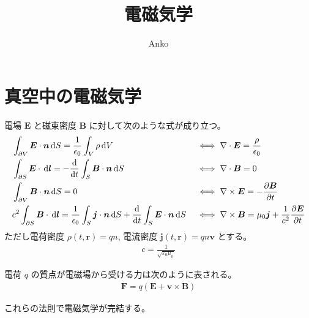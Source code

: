 \documentclass[uplatex,dvipdfmx,a4paper,11pt]{jlreq}
\title{電磁気学}
\author{Anko}
\newcommand{\EE}{\bm{E}}
\newcommand{\BB}{\bm{B}}
\newcommand{\rr}{\bm{r}}
\newcommand{\vnabla}{\mathbf{\nabla}}
\theoremstyle{definition}
\begin{document}
\maketitle
\tableofcontents
\clearpage

\section{真空中の電磁気学}
\begin{definition}
  電場 $\EE$ と磁束密度 $\BB$ に対して次のような式が成り立つ。
  \begin{align}
     & \int_{\partial V}\EE\cdot\bm{n}\dl{S} = \frac{1}{\epsilon_0}\int_V\rho\dl{V}                                                       &  & \iff \vnabla\cdot\EE  = \frac{\rho}{\epsilon_0}                                  \\
     & \int_{\partial S}\EE\cdot\dl{\bm{l}} = -\diff{}{t}\int_S\BB\cdot\bm{n}\dl{S}                                                       &  & \iff \vnabla\cdot\BB  = 0                                                        \\
     & \int_{\partial V}\BB\cdot\bm{n}\dl{S} = 0                                                                                          &  & \iff \vnabla\times\EE = -\diffp{\BB}{t}                                          \\
     & c^2\int_{\partial S}\BB\cdot\dl{\bm{l}} = \frac{1}{\epsilon_0}\int_S\bm{j}\cdot\bm{n}\dl{S} + \diff{}{t}\int_S\EE\cdot\bm{n}\dl{S} &  & \iff \vnabla\times\BB = \mu_0\bm{j} + \frac{1}{c^2}\diffp{\EE}{t} \label{Ampere}
  \end{align}
  ただし電荷密度 $\rho(t, \rr) = qn$, 電流密度 $\bm{j}(t, \rr) = qn\bm{v}$ とする。
  \begin{align}
    c = \frac{1}{\sqrt{\varepsilon_0\mu_0}}
  \end{align}
\end{definition}
\begin{definition}[Lorentz 力]
  電荷 $q$ の質点が電磁場から受ける力は次のように表される。
  \begin{align}
    \bm{F} = q(\EE + \bm{v}\times\BB)
  \end{align}
\end{definition}
これらの法則で電磁気学が完結する。
\end{document}
